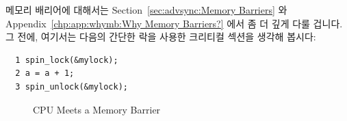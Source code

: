 메모리 배리어에 대해서는 Section~\ref{sec:advsync:Memory Barriers} 와
Appendix~\ref{chp:app:whymb:Why Memory Barriers?} 에서 좀 더 깊게 다룰 겁니다.
그 전에, 여기서는 다음의 간단한 락을 사용한 크리티컬 섹션을 생각해 봅시다:

\vspace{5pt}
\begin{minipage}[t]{\columnwidth}
\small
\begin{verbatim}
  1 spin_lock(&mylock);
  2 a = a + 1;
  3 spin_unlock(&mylock);
\end{verbatim}
\end{minipage}
\vspace{5pt}

\begin{figure}[tb]
\begin{center}
\end{center}
\caption{CPU Meets a Memory Barrier}
\end{figure}


